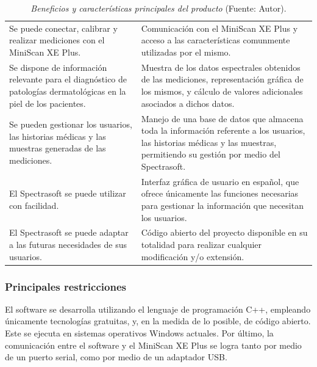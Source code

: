 	\begin{table}[h]
		\small
		\caption[Beneficios y caracter\'{i}sticas principales del producto]{\textit{Beneficios y caracter\'{i}sticas principales del producto} (Fuente: Autor).}
		\centering
		\setlength{\extrarowheight}{\altocelda}
		\begin{tabulary}{\anchotabla}{|J|J|}
			\hline
			 & \\ \hline
			Se puede conectar, calibrar y realizar mediciones con el MiniScan XE Plus. & 
			Comunicaci\'{o}n con el MiniScan XE Plus y acceso a las caracter\'{i}sticas comunmente utilizadas por el mismo.\\ \hline
			Se dispone de informaci\'{o}n relevante para el diagn\'{o}stico de patolog\'{i}as dermatol\'{o}gicas en la piel de los pacientes. &
			Muestra de los datos espectrales obtenidos de las mediciones, representaci\'{o}n gr\'{a}fica de los mismos, y c\'{a}lculo de valores adicionales asociados a dichos datos.\\ \hline
			Se pueden gestionar los usuarios, las historias m\'{e}dicas y las muestras generadas de las mediciones. &
			Manejo de una base de datos que almacena toda la informaci\'{o}n referente a los usuarios, las historias m\'{e}dicas y las muestras, permitiendo su gesti\'{o}n por medio del Spectrasoft.\\ \hline
			El Spectrasoft se puede utilizar con facilidad. &
			Interfaz gr\'{a}fica de usuario en espa\~{n}ol, que ofrece \'{u}nicamente las funciones necesarias para gestionar la informaci\'{o}n que necesitan los usuarios. \\ \hline
			El Spectrasoft se puede adaptar a las futuras necesidades de sus usuarios. &
			C\'{o}digo abierto del proyecto disponible en su totalidad para realizar cualquier modificaci\'{o}n y/o extensi\'{o}n.\\ \hline
		\end{tabulary}
	\end{table}
	
	\subsubsection{Principales restricciones}
	
	El software se desarrolla utilizando el lenguaje de programaci\'{o}n C++, empleando \'{u}nicamente tecnolog\'{i}as gratuitas, y, en la medida de lo posible, de c\'{o}digo abierto. Este se ejecuta en sistemas operativos Windows actuales. Por \'{u}ltimo, la comunicaci\'{o}n entre el software y el MiniScan XE Plus se logra tanto por medio de un puerto serial, como por medio de un adaptador USB.
	
